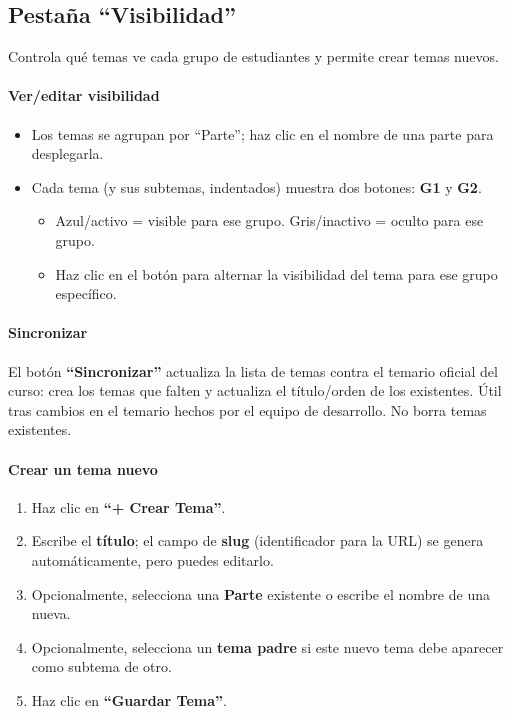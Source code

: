 \documentclass[11pt,a4paper]{article}
\begin{document}
\subsection{Pestaña ``Visibilidad''}

Controla qué temas ve cada grupo de estudiantes y permite crear temas nuevos.

\paragraph{Ver/editar visibilidad}
\begin{itemize}
  \item Los temas se agrupan por ``Parte''; haz clic en el nombre de una parte para desplegarla.
  \item Cada tema (y sus subtemas, indentados) muestra dos botones: \textbf{G1} y \textbf{G2}.
  \begin{itemize}
    \item Azul/activo = visible para ese grupo. Gris/inactivo = oculto para ese grupo.
    \item Haz clic en el botón para alternar la visibilidad del tema para ese grupo específico.
  \end{itemize}
\end{itemize}

\paragraph{Sincronizar}
El botón \textbf{``Sincronizar''} actualiza la lista de temas contra el temario oficial del curso: crea los temas que falten y actualiza el título/orden de los existentes. Útil tras cambios en el temario hechos por el equipo de desarrollo. No borra temas existentes.

\paragraph{Crear un tema nuevo}
\begin{enumerate}
  \item Haz clic en \textbf{``+ Crear Tema''}.
  \item Escribe el \textbf{título}; el campo de \textbf{slug} (identificador para la URL) se genera automáticamente, pero puedes editarlo.
  \item Opcionalmente, selecciona una \textbf{Parte} existente o escribe el nombre de una nueva.
  \item Opcionalmente, selecciona un \textbf{tema padre} si este nuevo tema debe aparecer como subtema de otro.
  \item Haz clic en \textbf{``Guardar Tema''}.
\end{enumerate}
\end{document}
